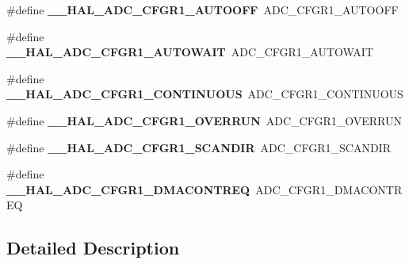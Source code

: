 \begin{DoxyCompactItemize}
\item 
\mbox{\label{group___h_a_l___a_d_c___aliased___macros_gab767937348c3e3b3c22e7316e42004c1}} 
\#define {\bfseries \+\_\+\+\_\+\+H\+A\+L\+\_\+\+A\+D\+C\+\_\+\+C\+F\+G\+R1\+\_\+\+A\+U\+T\+O\+O\+FF}~A\+D\+C\+\_\+\+C\+F\+G\+R1\+\_\+\+A\+U\+T\+O\+O\+FF
\item 
\mbox{\label{group___h_a_l___a_d_c___aliased___macros_ga400e3c69f55dad73669df7ce10297066}} 
\#define {\bfseries \+\_\+\+\_\+\+H\+A\+L\+\_\+\+A\+D\+C\+\_\+\+C\+F\+G\+R1\+\_\+\+A\+U\+T\+O\+W\+A\+IT}~A\+D\+C\+\_\+\+C\+F\+G\+R1\+\_\+\+A\+U\+T\+O\+W\+A\+IT
\item 
\mbox{\label{group___h_a_l___a_d_c___aliased___macros_ga6e3bc5992840ed200085c9b3ba68d7d2}} 
\#define {\bfseries \+\_\+\+\_\+\+H\+A\+L\+\_\+\+A\+D\+C\+\_\+\+C\+F\+G\+R1\+\_\+\+C\+O\+N\+T\+I\+N\+U\+O\+US}~A\+D\+C\+\_\+\+C\+F\+G\+R1\+\_\+\+C\+O\+N\+T\+I\+N\+U\+O\+US
\item 
\mbox{\label{group___h_a_l___a_d_c___aliased___macros_ga60d5ad7e386833338f43e293120fd20a}} 
\#define {\bfseries \+\_\+\+\_\+\+H\+A\+L\+\_\+\+A\+D\+C\+\_\+\+C\+F\+G\+R1\+\_\+\+O\+V\+E\+R\+R\+UN}~A\+D\+C\+\_\+\+C\+F\+G\+R1\+\_\+\+O\+V\+E\+R\+R\+UN
\item 
\mbox{\label{group___h_a_l___a_d_c___aliased___macros_gacadf737dca92c21560405c914f98ab06}} 
\#define {\bfseries \+\_\+\+\_\+\+H\+A\+L\+\_\+\+A\+D\+C\+\_\+\+C\+F\+G\+R1\+\_\+\+S\+C\+A\+N\+D\+IR}~A\+D\+C\+\_\+\+C\+F\+G\+R1\+\_\+\+S\+C\+A\+N\+D\+IR
\item 
\mbox{\label{group___h_a_l___a_d_c___aliased___macros_gad36423da25741a685c5aefd3cd0d08ee}} 
\#define {\bfseries \+\_\+\+\_\+\+H\+A\+L\+\_\+\+A\+D\+C\+\_\+\+C\+F\+G\+R1\+\_\+\+D\+M\+A\+C\+O\+N\+T\+R\+EQ}~A\+D\+C\+\_\+\+C\+F\+G\+R1\+\_\+\+D\+M\+A\+C\+O\+N\+T\+R\+EQ
\end{DoxyCompactItemize}


\subsection{Detailed Description}
